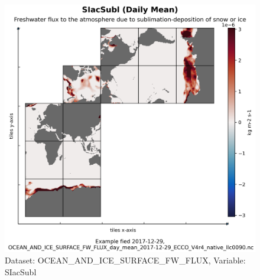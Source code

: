 \begin{figure}[H]
\centering
\includegraphics[scale=0.55]{../images/plots/native_plots/Ocean_and_Sea-Ice_Surface_Freshwater_Fluxes/SIacSubl.png}
\caption{Dataset: OCEAN\_AND\_ICE\_SURFACE\_FW\_FLUX, Variable: SIacSubl}
\label{tab:table-OCEAN_AND_ICE_SURFACE_FW_FLUX_SIacSubl-Plot}
\end{figure}
\pagebreak

